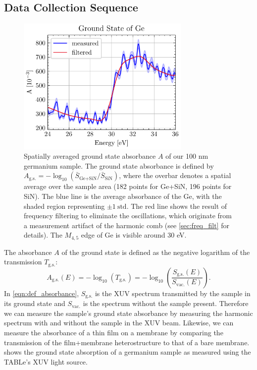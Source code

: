 \subsection{Data Collection Sequence}
\label{sec:data_collection_sequence}

\begin{figure}
	\centering
	\includegraphics[width=0.75\textwidth]{figures/chap4/Ge_ground_state.pdf}
	\caption{Spatially averaged ground state absorbance $A$ of our 100 nm germanium sample. The ground state absorbance is defined by $A_{\textrm{g.s.}}=-\log_{10}(\bar{S}_{\textrm{Ge+SiN}} / \bar{S}_{\textrm{SiN}})$, where the overbar denotes a spatial average over the sample area (182 points for Ge+SiN, 196 points for SiN). The blue line is the average absorbance of the Ge, with the shaded region representing ${\pm 1 \ \textrm{std}}$. The red line shows the result of frequency filtering to eliminate the oscillations, which originate from a measurement artifact of the harmonic comb (see \cref{sec:freq_filt} for details). The $M_{4,5}$ edge of Ge is visible around 30 eV.}
	\label{fig:Ge_ground_state}
\end{figure}

The absorbance $A$ of the ground state is defined as the negative logarithm of the transmission $T_{\textrm{g.s.}}$:
\begin{equation}
A_{\textrm{g.s.}}(E) = -\log_{10}(T_{\textrm{g.s.}}) = - \log_{10} \left( \frac{S_{\textrm{g.s.}}(E)}{S_{\textrm{vac.}}(E)} \right).
\label{eqn:def_absorbance}
\end{equation}
In \cref{eqn:def_absorbance}, $S_{\textrm{g.s.}}$ is the XUV spectrum transmitted by the sample in its ground state and $S_{\textrm{vac.}}$ is the spectrum without the sample present. Therefore we can measure the sample's ground state absorbance by measuring the harmonic spectrum with and without the sample in the XUV beam. Likewise, we can measure the absorbance of a thin film on a membrane by comparing the transmission of the film+membrane heterostructure to that of a bare membrane.  shows the ground state absorption of a germanium sample as measured using the TABLe's XUV light source. 


